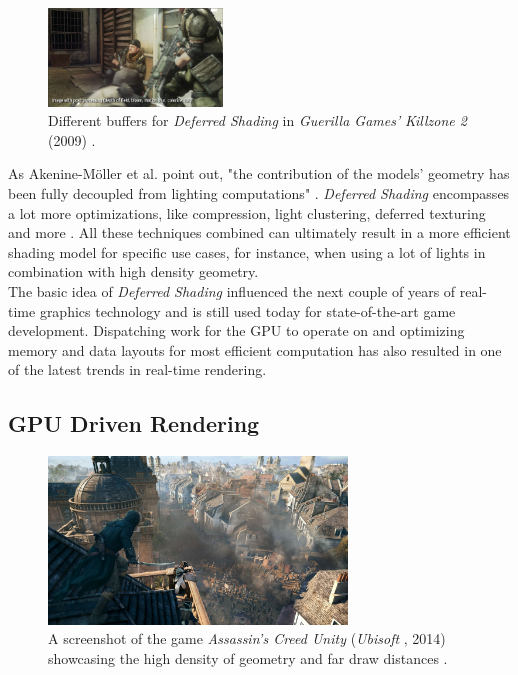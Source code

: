 \begin{figure}[h]
    \includegraphics[width=175px]{images/graphics/killzone-2-buffer-post.jpg}
    \caption{Different buffers for \emph{Deferred Shading} in \emph{Guerilla Games'} \emph{Killzone 2} (2009) 
    \cite{Valient2007}.}
    \label{fig:deferred-shading-buffers}
\end{figure}

\noindent
As Akenine-Möller et al. point out, "the contribution of the models’ geometry has been fully decoupled from lighting 
computations" \cite{AkenineMoeller2018}. \emph{Deferred Shading} encompasses a lot more optimizations, like compression, 
light clustering, deferred texturing and more \cite{AkenineMoeller2018}. All these techniques combined can ultimately 
result in a more efficient shading model for specific use cases, for instance, when using a lot of lights in combination 
with high density geometry.\\

\noindent
The basic idea of \emph{Deferred Shading} influenced the next couple of years of real-time graphics technology and is 
still used today for state-of-the-art game development. Dispatching work for the \ac{GPU} to operate on and optimizing 
memory and data layouts for most efficient computation has also resulted in one of the latest trends in real-time 
rendering.

\subsection*{GPU Driven Rendering}

\begin{figure}[h]
    \centering
    \includegraphics[width=300px]{images/graphics/assassins-creed-unity-gameplay.jpg}
    \caption{A screenshot of the game \emph{Assassin's Creed Unity} (\emph{Ubisoft} \cite{Ubisoft2014}, 2014) 
    showcasing the high density of geometry and far draw distances \cite{Burke2014}.}
    \label{fig:assassins-creed-unity-gameplay}
\end{figure}

